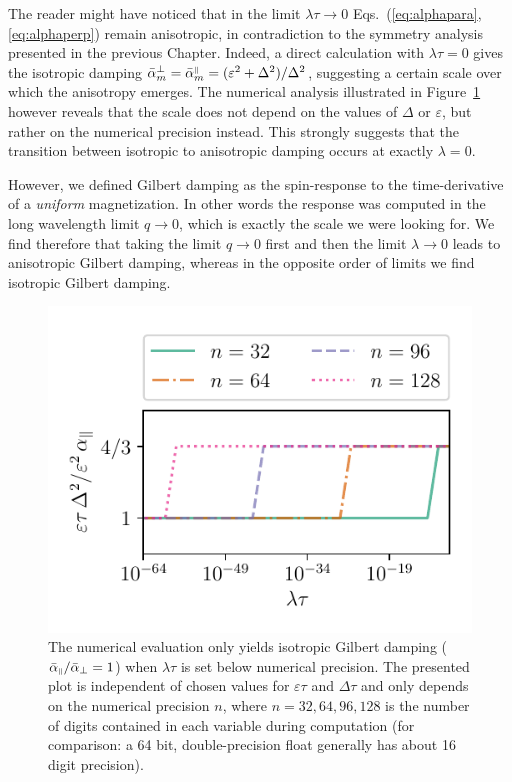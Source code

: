 The reader might have noticed that in the limit $\lambda\tau\rightarrow0$ Eqs.~(\ref{eq:alphapara},\ref{eq:alphaperp}) remain anisotropic, in contradiction to the symmetry analysis presented in the previous Chapter. Indeed, a direct calculation with $\lambda\tau=0$ gives the isotropic damping $\bar{\alpha}_m^{\perp}=\bar{\alpha}_m^{{\scriptscriptstyle\parallel}}=(\varepsilon^2+\Delta^2)/\Delta^2$, suggesting a certain scale over which the anisotropy emerges. The numerical analysis illustrated in Figure~\ref{fig:num_test} however reveals that the scale does not depend on the values of $\Delta$ or $\varepsilon$, but rather on the numerical precision instead. This strongly suggests that the transition between isotropic to anisotropic damping occurs at exactly $\lambda=0$. 

However, we defined Gilbert damping as the spin-response to the time-derivative of a \emph{uniform} magnetization. In other words the response was computed in the long wavelength limit $q\rightarrow0$, which is exactly the scale we were looking for. We find therefore that taking the limit $q\rightarrow0$ first and then the limit $\lambda\rightarrow0$ leads to anisotropic Gilbert damping, whereas in the opposite order of limits we find isotropic Gilbert damping.  

\begin{figure}
    \centering
    \includegraphics[width=0.75\linewidth]{gfx/numerical_test}
    \caption{The numerical evaluation only yields isotropic Gilbert damping ($\bar{\alpha}_{{\scriptscriptstyle\parallel}}/\bar{\alpha}_{\perp}=1$) when $\lambda\tau$ is set below numerical precision. The presented plot is independent of chosen values for $\varepsilon\tau$ and $\Delta\tau$ and only depends on the numerical precision $n$, where $n=32,64,96,128$ is the number of digits contained in each variable during computation (for comparison: a 64 bit, double-precision float generally has about 16 digit precision). }
    \label{fig:num_test}
\end{figure}

